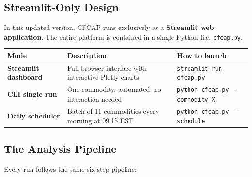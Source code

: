 \documentclass[11pt,a4paper]{article}
\begin{document}
\subsection{Streamlit-Only Design}

In this updated version, CFCAP runs exclusively as a \textbf{Streamlit web application}. The entire platform is contained in a single Python file, \texttt{cfcap.py}.

\begin{center}
\begin{tabularx}{\textwidth}{>{\bfseries}l X l}
\toprule
Mode & Description & How to launch \\
\midrule
Streamlit dashboard & Full browser interface with interactive Plotly charts & \texttt{streamlit run cfcap.py} \\
CLI single run      & One commodity, automated, no interaction needed & \texttt{python cfcap.py -{}-commodity X} \\
Daily scheduler     & Batch of 11 commodities every morning at 09:15 EST & \texttt{python cfcap.py -{}-schedule} \\
\bottomrule
\end{tabularx}
\end{center}

\subsection{The Analysis Pipeline}

Every run follows the same six-step pipeline:

\medskip
\begin{center}
\end{center}
\end{document}
